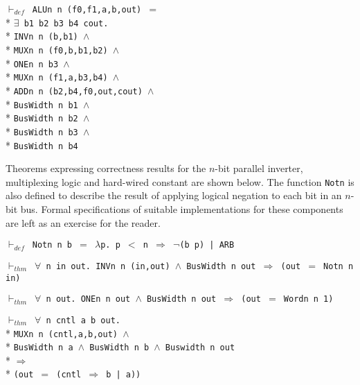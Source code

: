\begin{normalsize}
\begin{minipage}{17cm}
$\vdash_{def}$\verb" ALUn n (f0,f1,a,b,out) "$=$\\*
$\exists$\verb" b1 b2 b3 b4 cout."\\*
\verb"INVn n (b,b1) "$\wedge$\\*
\verb"MUXn n (f0,b,b1,b2) "$\wedge$\\*
\verb"ONEn n b3 "$\wedge$\\*
\verb"MUXn n (f1,a,b3,b4) "$\wedge$\\*
\verb"ADDn n (b2,b4,f0,out,cout) "$\wedge$\\*
\verb"BusWidth n b1 "$\wedge$\\*
\verb"BusWidth n b2 "$\wedge$\\*
\verb"BusWidth n b3 "$\wedge$\\*
\verb"BusWidth n b4"
\end{minipage}

Theorems expressing correctness results
for the \mbox{$n$-bit} parallel inverter,
multiplexing logic and hard-wired constant are shown below.
The function \verb"Notn" is also defined to describe the result of
applying logical negation to each bit in an \mbox{$n$-bit} bus.
Formal specifications of suitable implementations for these components
are left as an exercise for the reader.

$\vdash_{def}$\verb" Notn n b "$=$\verb" "$\lambda$\verb"p. p "$<$\verb" n "$\Longrightarrow$\verb" "$\neg$\verb"(b p) | ARB"

$\vdash_{thm}$\verb" "$\forall$\verb" n in out. INVn n (in,out) "$\wedge$\verb" BusWidth n out "$\Longrightarrow$\verb" (out "$=$\verb" Notn n in)"

$\vdash_{thm}$\verb" "$\forall$\verb" n out. ONEn n out "$\wedge$\verb" BusWidth n out "$\Longrightarrow$\verb" (out "$=$\verb" Wordn n 1)"

\begin{minipage}{17cm}
$\vdash_{thm}$\verb" "$\forall$\verb" n cntl a b out."\\*
\verb"MUXn n (cntl,a,b,out) "$\wedge$\\*
\verb"BusWidth n a "$\wedge$\verb" BusWidth n b "$\wedge$\verb" Buswidth n out"\\*
$\Longrightarrow$\\*
\verb"(out "$=$\verb" (cntl "$\Rightarrow$\verb" b | a))"
\end{minipage}


\end{normalsize}
